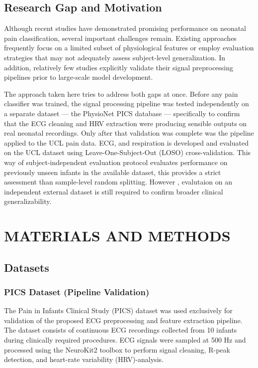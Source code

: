 \documentclass[conference]{IEEEtran}
\begin{document}
\subsection{Research Gap and Motivation}

Although recent studies have demonstrated promising performance on neonatal pain classification, several important challenges remain. Existing approaches frequently focus on a limited subset of physiological features or employ evaluation strategies that may not adequately assess subject-level generalization. In addition, relatively few studies explicitly validate their signal preprocessing pipelines prior to large-scale model development.

The approach taken here tries to address both gaps at once. Before any pain classifier was trained, the signal processing pipeline was tested independently on a separate dataset — the PhysioNet PICS database — specifically to confirm that the ECG cleaning and HRV extraction were producing sensible outputs on real neonatal recordings. Only after that validation was complete was the pipeline applied to the UCL pain data. ECG, and respiration is developed and evaluated on the UCL dataset using Leave-One-Subject-Out (LOSO) cross-validation. This way of subject-independent evaluation protocol evaluates performance on previously unseen infants in the available dataset, this provides a strict assessment than sample-level random splitting. However , evalutaion on an independent external dataset is still required to confirm broader clinical generalizability. 

\section{MATERIALS AND METHODS}

\subsection{Datasets}

\subsubsection{PICS Dataset (Pipeline Validation)}

The Pain in Infants Clinical Study (PICS)\cite{moody2001physionet} dataset was used exclusively for validation of the proposed ECG preprocessing and feature extraction pipeline. The dataset consists of continuous ECG recordings collected from 10 infants during clinically required procedures. ECG signals were sampled at 500 Hz and processed using the NeuroKit2\cite{makowski2021neurokit2} toolbox to perform signal cleaning, R-peak detection, and heart-rate variability (HRV)-analysis\cite{taskforce1996hrv}.
\end{document}
